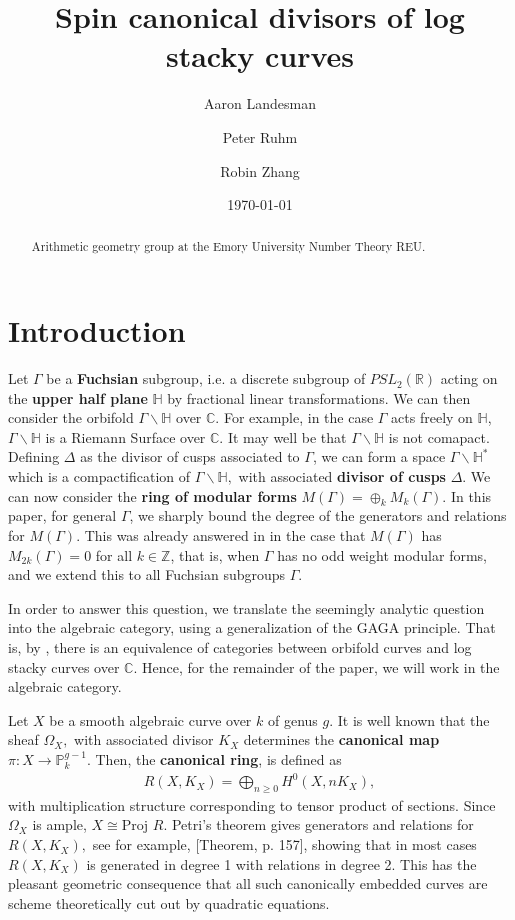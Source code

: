 \documentclass{amsart}
\title{Spin canonical divisors of log stacky curves}
\author{Aaron Landesman}
\author{Peter Ruhm}
\author{Robin Zhang}
\date{\today}
\theoremstyle{plain}
\theoremstyle{definition}
\theoremstyle{remark}
\numberwithin{equation}{section}
\newcommand\bh{{\mathbb H}}
\newcommand\BC{{\mathbb C}}
\newcommand\BR{{\mathbb R}}
\newcommand\BP{{\mathbb P}}
\newcommand\BZ{{\mathbb Z}}
\newcommand \proj{\text{Proj }}
\begin{document}
\begin{abstract}
  Arithmetic geometry group at the Emory University Number Theory
	REU.
\end{abstract}

\maketitle

\tableofcontents




\section{Introduction}

Let $\Gamma$ be a {\bf Fuchsian} subgroup, i.e. a discrete subgroup of $PSL_2(\BR)$ acting on the {\bf upper half plane} $\bh$ by fractional linear transformations. We can then consider the orbifold $\Gamma \backslash \bh$ over $\BC$. For example, in the case $\Gamma$ acts freely on $\bh$, $\Gamma \backslash \bh$ is a Riemann Surface over $\BC$. It may well be that $\Gamma \backslash \bh$ is not comapact. Defining $\Delta$ as the divisor of cusps associated to $\Gamma$, we can form a space $\Gamma \backslash \bh^*$ which is a compactification of $\Gamma \backslash \bh,$ with associated {\bf divisor of cusps} $\Delta$. We can now consider the {\bf ring of modular forms} $M(\Gamma) = \oplus_k M_k(\Gamma)$. In this paper, for general $\Gamma$, we sharply bound the degree of the generators and relations for $M(\Gamma).$ This was already answered in \cite[]{vzb:stacky} in the case that $M(\Gamma)$ has $M_{2k}(\Gamma) = 0$ for all $k \in \BZ$, that is, when $\Gamma$ has no odd weight modular forms, and we extend this to all Fuchsian subgroups $\Gamma$.

In order to answer this question, we translate the seemingly analytic question into the algebraic category, using a generalization of the GAGA principle. That is, by \cite[Proposition 6.1.5]{vzb:stacky}, there is an equivalence of categories between orbifold curves and log stacky curves over $\BC$. Hence, for the remainder of the paper, we will work in the algebraic category.

Let $X$ be a smooth algebraic curve over $k$ of genus $g$. It is well known that the sheaf $\Omega_X,$ with associated divisor $K_X$ determines the {\bf canonical map} $\pi:X \rightarrow \BP_k^{g-1}.$ Then, the {\bf canonical ring}, is defined as
\begin{align*}
	R(X,K_X) = \bigoplus_{n \geq 0} H^0(X,nK_X),
\end{align*}
with multiplication structure corresponding to tensor product of sections. Since $\Omega_X$ is ample, $X \cong \proj R$. Petri's theorem gives generators and relations for $R(X,K_X),$ see for example, \cite{saint-donat:proj}[Theorem, p. 157], showing that in most cases $R(X,K_X)$ is generated in degree 1 with relations in degree 2. This has the pleasant geometric consequence that all such canonically embedded curves are scheme theoretically cut out by quadratic equations.
\end{document}
